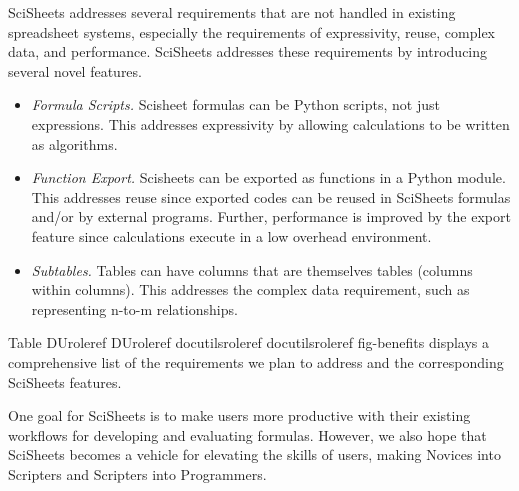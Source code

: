 \documentclass[letterpaper,compsoc,twoside]{IEEEtran}
\providecommand*{\DUrole}[2]{%
  \ifcsname DUrole#1\endcsname%
    \csname DUrole#1\endcsname{#2}%
  \else%
    \ifcsname docutilsrole#1\endcsname%
      \csname docutilsrole#1\endcsname{#2}%
    \else%
      #2%
    \fi%
  \fi%
}
\begin{document}
SciSheets addresses several requirements that are
not handled
in existing spreadsheet systems,
especially the requirements of expressivity, reuse, complex data, and performance.
SciSheets addresses these requirements by introducing
several novel features.%
\begin{itemize}

\item 

\emph{Formula Scripts.}
Scisheet formulas can be Python scripts, not just expressions.
This addresses expressivity by allowing
calculations to be written as algorithms.
\item 

\emph{Function Export.}
Scisheets can be exported as functions in a Python module.
This addresses reuse since
exported codes
can be reused in SciSheets formulas and/or by
external programs.
Further, performance is improved by the export feature
since calculations execute
in a low overhead environment.
\item 

\emph{Subtables.}
Tables can have columns that are themselves tables (columns within columns).
This addresses the complex data requirement,
such as representing n-to-m relationships.
\end{itemize}


Table \DUrole{ref}{fig-benefits} displays
a comprehensive list of the requirements we plan to address
and the corresponding SciSheets features.

One goal for SciSheets is to make users more productive with their existing
workflows for developing and evaluating formulas.
However, we also hope that SciSheets becomes a vehicle for elevating the skills
of users, making Novices into Scripters and Scripters into Programmers.
\end{document}
